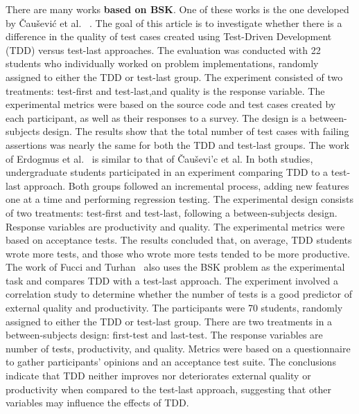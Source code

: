 There are many works \textbf{based on BSK}. One of these works is the one developed by \v Cau\v sevi\'c et al. ~\cite{Causevic2012}. The goal of this article is to investigate whether there is a difference in the quality of test cases created using Test-Driven Development (TDD) versus test-last approaches. The evaluation was conducted with 22 students who individually worked on problem implementations, randomly assigned to either the TDD or test-last group. The experiment consisted of two treatments: test-first and test-last,and quality is the response variable. The experimental metrics were based on the source code and test cases created by each participant, as well as their responses to a survey. The design is a between-subjects design. The results show that the total number of test cases with failing assertions was nearly the same for both the TDD and test-last groups.
The work of Erdogmus et al.~\cite{Erdogmus2005} is similar to that of \v Cau\v sevi'c et al. In both studies, undergraduate students participated in an experiment comparing TDD to a test-last approach. Both groups followed an incremental process, adding new features one at a time and performing regression testing. The experimental design consists of two treatments: test-first and test-last, following a between-subjects design. Response variables are productivity and quality. The experimental metrics were based on acceptance tests. The results concluded that, on average, TDD students wrote more tests, and those who wrote more tests tended to be more productive. %
The work of Fucci and Turhan~\cite{Fucci2013} also uses the BSK problem as the experimental task and compares TDD with a test-last approach. The experiment involved a correlation study to determine whether the number of tests is a good predictor of external quality and productivity. The participants were 70 students, randomly assigned to either the TDD or test-last group. There are two treatments in a between-subjects design: first-test and last-test. The response variables are number of tests, productivity, and quality. Metrics were based on a questionnaire to gather participants' opinions and an acceptance test suite. The conclusions indicate that TDD neither improves nor deteriorates external quality or productivity when compared to the test-last approach, suggesting that other variables may influence the effects of TDD.


